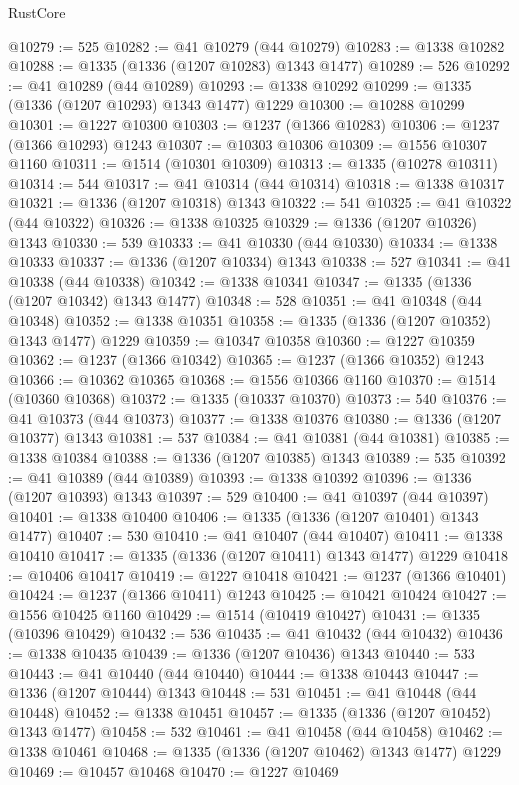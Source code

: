 \begin{lexlean}{RustCore}
\begin{coremodule}
@10279 := 525
@10282 := @41 @10279 (@44 @10279)
@10283 := @1338 @10282
@10288 := @1335 (@1336 (@1207 @10283) @1343 @1477)
@10289 := 526
@10292 := @41 @10289 (@44 @10289)
@10293 := @1338 @10292
@10299 := @1335 (@1336 (@1207 @10293) @1343 @1477) @1229
@10300 := @10288 @10299
@10301 := @1227 @10300
@10303 := @1237 (@1366 @10283)
@10306 := @1237 (@1366 @10293) @1243
@10307 := @10303 @10306
@10309 := @1556 @10307 @1160
@10311 := @1514 (@10301 @10309)
@10313 := @1335 (@10278 @10311)
@10314 := 544
@10317 := @41 @10314 (@44 @10314)
@10318 := @1338 @10317
@10321 := @1336 (@1207 @10318) @1343
@10322 := 541
@10325 := @41 @10322 (@44 @10322)
@10326 := @1338 @10325
@10329 := @1336 (@1207 @10326) @1343
@10330 := 539
@10333 := @41 @10330 (@44 @10330)
@10334 := @1338 @10333
@10337 := @1336 (@1207 @10334) @1343
@10338 := 527
@10341 := @41 @10338 (@44 @10338)
@10342 := @1338 @10341
@10347 := @1335 (@1336 (@1207 @10342) @1343 @1477)
@10348 := 528
@10351 := @41 @10348 (@44 @10348)
@10352 := @1338 @10351
@10358 := @1335 (@1336 (@1207 @10352) @1343 @1477) @1229
@10359 := @10347 @10358
@10360 := @1227 @10359
@10362 := @1237 (@1366 @10342)
@10365 := @1237 (@1366 @10352) @1243
@10366 := @10362 @10365
@10368 := @1556 @10366 @1160
@10370 := @1514 (@10360 @10368)
@10372 := @1335 (@10337 @10370)
@10373 := 540
@10376 := @41 @10373 (@44 @10373)
@10377 := @1338 @10376
@10380 := @1336 (@1207 @10377) @1343
@10381 := 537
@10384 := @41 @10381 (@44 @10381)
@10385 := @1338 @10384
@10388 := @1336 (@1207 @10385) @1343
@10389 := 535
@10392 := @41 @10389 (@44 @10389)
@10393 := @1338 @10392
@10396 := @1336 (@1207 @10393) @1343
@10397 := 529
@10400 := @41 @10397 (@44 @10397)
@10401 := @1338 @10400
@10406 := @1335 (@1336 (@1207 @10401) @1343 @1477)
@10407 := 530
@10410 := @41 @10407 (@44 @10407)
@10411 := @1338 @10410
@10417 := @1335 (@1336 (@1207 @10411) @1343 @1477) @1229
@10418 := @10406 @10417
@10419 := @1227 @10418
@10421 := @1237 (@1366 @10401)
@10424 := @1237 (@1366 @10411) @1243
@10425 := @10421 @10424
@10427 := @1556 @10425 @1160
@10429 := @1514 (@10419 @10427)
@10431 := @1335 (@10396 @10429)
@10432 := 536
@10435 := @41 @10432 (@44 @10432)
@10436 := @1338 @10435
@10439 := @1336 (@1207 @10436) @1343
@10440 := 533
@10443 := @41 @10440 (@44 @10440)
@10444 := @1338 @10443
@10447 := @1336 (@1207 @10444) @1343
@10448 := 531
@10451 := @41 @10448 (@44 @10448)
@10452 := @1338 @10451
@10457 := @1335 (@1336 (@1207 @10452) @1343 @1477)
@10458 := 532
@10461 := @41 @10458 (@44 @10458)
@10462 := @1338 @10461
@10468 := @1335 (@1336 (@1207 @10462) @1343 @1477) @1229
@10469 := @10457 @10468
@10470 := @1227 @10469

\end{coremodule}
\end{lexlean}
